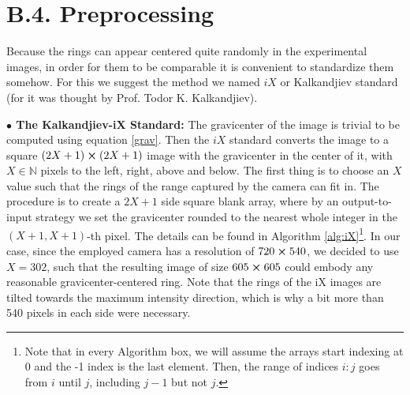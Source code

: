 \documentclass[11pt, a4paper, twoside]{article} %
\newcommand{\N}{\mathbb{N}}
\begin{document}
\section*{B.4. Preprocessing }\vspace{-0.1cm}
Because the rings can appear centered quite randomly in the experimental images, in order for them to be comparable it is convenient to standardize them somehow. For this we suggest the method we named $iX$ or Kalkandjiev standard (for it was thought by Prof. Todor K. Kalkandjiev).

{\bf $\bullet$ The Kalkandjiev-iX Standard: }The gravicenter of the image is trivial to be computed using equation \eqref{grav}. Then the $iX$ standard converts the image to a square $(2X+1)\cross(2X+1)$ image with the gravicenter in the center of it, with $X\in\N$ pixels to the left, right, above and below. The first thing is to choose an $X$ value such that the rings of the range captured by the camera can fit in. The procedure is to create a $2X+1$ side square blank array, where by an output-to-input strategy we set the gravicenter rounded to the nearest whole integer in the $(X+1,X+1)$-th pixel. The details can be found in Algorithm \ref{alg:iX}\footnote{Note that in every Algorithm box, we will assume the arrays start indexing at 0 and the -1 index is the last element. Then, the range of indices $i:j$ goes from $i$ until $j$, including $j-1$ but not $j$.}. In our case, since the employed camera has a resolution of $720\cross 540$, we decided to use $X=302$, such that the resulting image of size $605\cross 605$ could embody any reasonable gravicenter-centered ring. Note that the rings of the iX images are tilted towards the maximum intensity direction, which is why a bit more than 540 pixels in each side were necessary.

\end{document}
